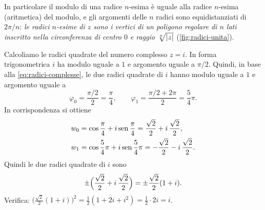 In particolare il modulo di una radice $n$-esima è uguale alla radice $n$-esima
(aritmetica) del modulo, e gli argomenti delle $n$ radici sono equidistanziati di
$2\pi/n$: \emph{le radici $n$-esime di $z$ sono i vertici di un poligono regolare di $n$
lati inscritto nella circonferenza di centro $0$ e raggio $\sqrt[n]{\lvert z\rvert}$}
(\cref{fig:radici-unita}).

\begin{esempio}\label{es:radici-i}
Calcoliamo le radici quadrate del numero complesso $z=i$. In forma trigonometrica $i$ ha
modulo uguale a $1$ e argomento uguale a $\pi/2$. Quindi, in base alla
\eqref{eq:radici-complesse}, le due radici quadrate di $i$ hanno modulo uguale a $1$ e
argomento uguale a
\begin{equation}\label{eq:argomenti-radici-i}
  \varphi_{0}=\frac{\pi/2}{2}=\frac\pi4, \qquad \varphi_{1}=\frac{\pi/2+2\pi}{2}=\frac54\pi .
\end{equation}
In corrispondenza si ottiene
\begin{align*}
  w_{0}&=\cos\frac\pi4+i\operatorname{sen}\frac\pi4=\frac{\sqrt2}{2}+i\,\frac{\sqrt2}{2},\\
  w_{1}&=\cos\frac54\pi+i\operatorname{sen}\frac54\pi=-\frac{\sqrt2}{2}-i\,\frac{\sqrt2}{2}.
\end{align*}
Quindi le due radici quadrate di $i$ sono
\begin{equation}\label{eq:radici-i}
  \pm\Bigl(\frac{\sqrt2}{2}+i\,\frac{\sqrt2}{2}\Bigr)=\pm\frac{\sqrt2}{2}(1+i).
\end{equation}
Verifica: $\bigl(\frac{\sqrt2}{2}(1+i)\bigr)^{2}=\frac12(1+2i+i^{2})=\frac12\cdot2i=i$.
\end{esempio}

